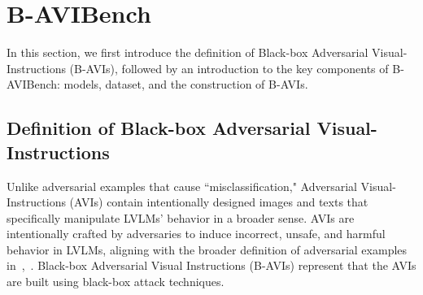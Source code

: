 \section{B-AVIBench}
\label{sec:method}

In this section, we first introduce the definition of Black-box Adversarial Visual-Instructions (B-AVIs), followed by an introduction to the key components of B-AVIBench: models, dataset, and the construction of B-AVIs.

\subsection{Definition of Black-box Adversarial Visual-Instructions}
Unlike adversarial examples that cause ``misclassification," Adversarial Visual-Instructions (AVIs) contain intentionally designed images and texts that specifically manipulate LVLMs' behavior in a broader sense. AVIs are intentionally crafted by adversaries to induce incorrect, unsafe, and harmful behavior in LVLMs, aligning with the broader definition of adversarial examples in~\cite{carlini2024aligned},~\cite{zhu2023promptbench}. Black-box Adversarial Visual Instructions (B-AVIs) represent that the AVIs are built using black-box attack techniques.

